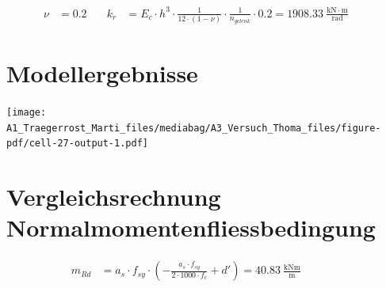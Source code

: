 \documentclass[
  11pt,
  letterpaper,
]{scrreprt}
\begin{document}
\[
\begin{aligned}
\nu& = 0.2 \quad & k_{r}& = E_{c} \cdot h^{3} \cdot \frac{1}{12 \cdot \left(1 - \nu\right)} \cdot \frac{1}{n_{gelenk}} \cdot 0.2 = 1908.33 \ \frac{\mathrm{kN} \cdot \mathrm{m}}{\mathrm{rad}} \quad &  
 \end{aligned}
\]

\section{Modellergebnisse}\label{modellergebnisse}

\texttt{[image: A1\_Traegerrost\_Marti\_files/mediabag/A3\_Versuch\_Thoma\_files/figure-pdf/cell-27-output-1.pdf]}

\section{Vergleichsrechnung
Normalmomentenfliessbedingung}\label{vergleichsrechnung-normalmomentenfliessbedingung}

\[
\begin{aligned}
m_{Rd}& = a_{s} \cdot f_{sy} \cdot \left(- \frac{a_{s} \cdot f_{sy}}{2 \cdot 1000 \cdot f_{c}} + {d}'\right) = 40.83 \ \frac{\mathrm{kNm}}{\mathrm{m}} \quad &  \quad &  
 \end{aligned}
\]
\end{document}
